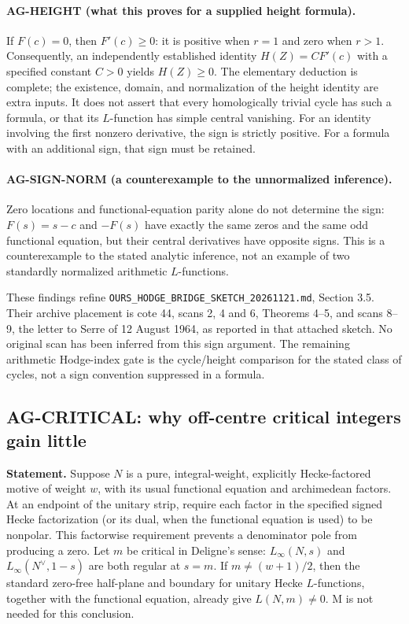 \paragraph{AG-HEIGHT (what this proves for a supplied height formula).}
If $F(c)=0$, then $F'(c)\ge0$: it is positive when $r=1$ and zero when
$r>1$. Consequently, an independently established identity
$H(Z)=C F'(c)$ with a specified constant $C>0$ yields $H(Z)\ge0$.
The elementary deduction is complete; the existence, domain, and
normalization of the height identity are extra inputs. It does not assert
that every homologically trivial cycle has such a formula, or that its
$L$-function has simple central vanishing. For an identity involving the
first nonzero derivative, the sign is strictly positive. For a formula with
an additional sign, that sign must be retained.

\paragraph{AG-SIGN-NORM (a counterexample to the unnormalized inference).}
Zero locations and functional-equation parity alone do not determine the
sign: $F(s)=s-c$ and $-F(s)$ have exactly the same zeros and the same odd
functional equation, but their central derivatives have opposite signs.
This is a counterexample to the stated analytic inference, not an example
of two standardly normalized arithmetic $L$-functions.

These findings refine \texttt{OURS\_HODGE\_BRIDGE\_SKETCH\_20261121.md},
Section 3.5. Their archive placement is cote 44, scans 2, 4 and 6,
Theorems 4--5, and scans 8--9, the letter to Serre of 12 August 1964,
as reported in that attached sketch. No original scan has been inferred
from this sign argument. The remaining arithmetic Hodge-index gate is
the cycle/height comparison for the stated class of cycles, not a sign
convention suppressed in a formula.

\subsection{AG-CRITICAL: why off-centre critical integers gain little}
\label{ag:critical}

\textbf{Statement.} Suppose $N$ is a pure, integral-weight, explicitly
Hecke-factored motive of weight $w$, with its usual functional equation
and archimedean factors. At an endpoint of the unitary strip, require each
factor in the specified signed Hecke factorization (or its dual, when the
functional equation is used) to be nonpolar. This factorwise requirement
prevents a denominator pole from producing a zero. Let $m$ be critical in
Deligne's sense: $L_\infty(N,s)$ and $L_\infty(N^\vee,1-s)$
are both regular at $s=m$. If $m\ne(w+1)/2$, then the standard
zero-free half-plane and boundary for unitary Hecke $L$-functions,
together with the functional equation, already give $L(N,m)\ne0$.
M is not needed for this conclusion.

